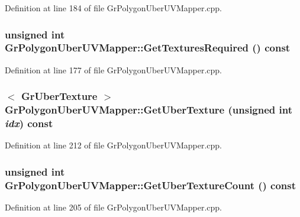 \begin{CompactItemize}
Definition at line 184 of file GrPolygonUberUVMapper.cpp.\hypertarget{class_gr_polygon_uber_u_v_mapper_1b1c2e827d9afdf7256660cd3059181b}{
\subsubsection[{GetTexturesRequired}]{\setlength{\rightskip}{0pt plus 5cm}unsigned int GrPolygonUberUVMapper::GetTexturesRequired () const}}
\label{class_gr_polygon_uber_u_v_mapper_1b1c2e827d9afdf7256660cd3059181b}




Definition at line 177 of file GrPolygonUberUVMapper.cpp.\hypertarget{class_gr_polygon_uber_u_v_mapper_053a382364662fe61fdc108fd98d9adb}{
\subsubsection[{GetUberTexture}]{$<$ {\bf GrUberTexture} $>$ GrPolygonUberUVMapper::GetUberTexture (unsigned int {\em idx}) const}}
\label{class_gr_polygon_uber_u_v_mapper_053a382364662fe61fdc108fd98d9adb}




Definition at line 212 of file GrPolygonUberUVMapper.cpp.\hypertarget{class_gr_polygon_uber_u_v_mapper_20d074282fcd83d769fdb08d13d410a2}{
\subsubsection[{GetUberTextureCount}]{\setlength{\rightskip}{0pt plus 5cm}unsigned int GrPolygonUberUVMapper::GetUberTextureCount () const}}
\label{class_gr_polygon_uber_u_v_mapper_20d074282fcd83d769fdb08d13d410a2}




Definition at line 205 of file GrPolygonUberUVMapper.cpp.\hypertarget{class_gr_polygon_uber_u_v_mapper_fa0335ced5f8d354def36aceac076856}{
}
\end{CompactItemize}
